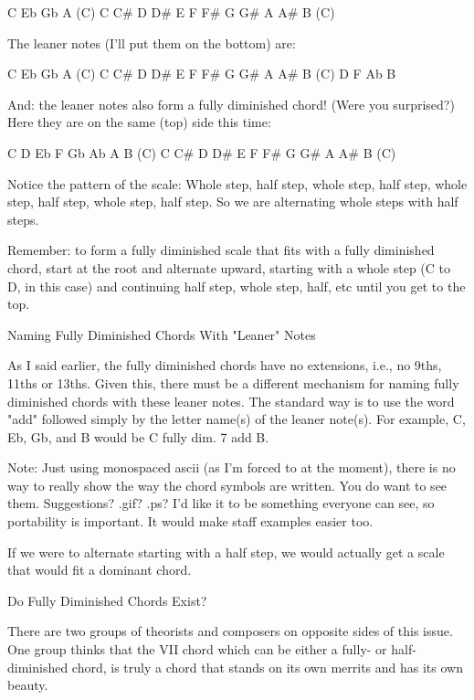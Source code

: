 C              Eb             Gb             A              (C)
C    C\#   D    D\#   E    F    F\#   G    G\#   A    A\#   B    (C)

The leaner notes (I'll put them on the bottom) are:

C              Eb             Gb             A              (C)
C    C\#   D    D\#   E    F    F\#   G    G\#   A    A\#   B    (C)
          D              F              Ab             B

And: the leaner notes also form a fully diminished chord! (Were you surprised?)
Here they are on the same (top) side this time:

C         D    Eb        F    Gb        Ab   A         B    (C)
C    C\#   D    D\#   E    F    F\#   G    G\#   A    A\#   B    (C)

Notice the pattern of the scale: Whole step, half step, whole step, half step,
whole step, half step, whole step, half step. So we are alternating whole steps
with half steps.

Remember: to form a fully diminished scale that fits with a fully diminished
chord, start at the root and alternate upward, starting with a whole step (C
to D, in this case) and continuing half step, whole step, half, etc until you
get to the top.

Naming Fully Diminished Chords With "Leaner" Notes

As I said earlier, the fully diminished chords have no extensions, i.e., no
9ths, 11ths or 13ths. Given this, there must be a different mechanism for
naming fully diminished chords with these leaner notes. The standard way
is to use the word "add" followed simply by the letter name(s) of the leaner
note(s). For example, C, Eb, Gb, and B would be C fully dim. 7 add B.

Note: Just using monospaced ascii (as I'm forced to at the moment), there is
no way to really show the way the chord symbols are written. You do want to
see them. Suggestions? .gif? .ps? I'd like it to be something everyone can
see, so portability is important. It would make staff examples easier too.

If we were to alternate starting with a half step, we would actually get a
scale that would fit a dominant chord.

Do Fully Diminished Chords Exist?

There are two groups of theorists and composers on opposite sides of this
issue. One group thinks that the VII chord which can be either a fully- or
half-diminished chord, is truly a chord that stands on its own merrits and
has its own beauty.

